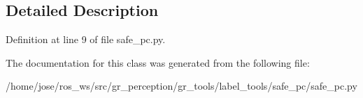 \subsection{Detailed Description}


Definition at line 9 of file safe\+\_\+pc.\+py.



The documentation for this class was generated from the following file\+:\begin{DoxyCompactItemize}
\item 
/home/jose/ros\+\_\+ws/src/gr\+\_\+perception/gr\+\_\+tools/label\+\_\+tools/safe\+\_\+pc/safe\+\_\+pc.\+py\end{DoxyCompactItemize}
